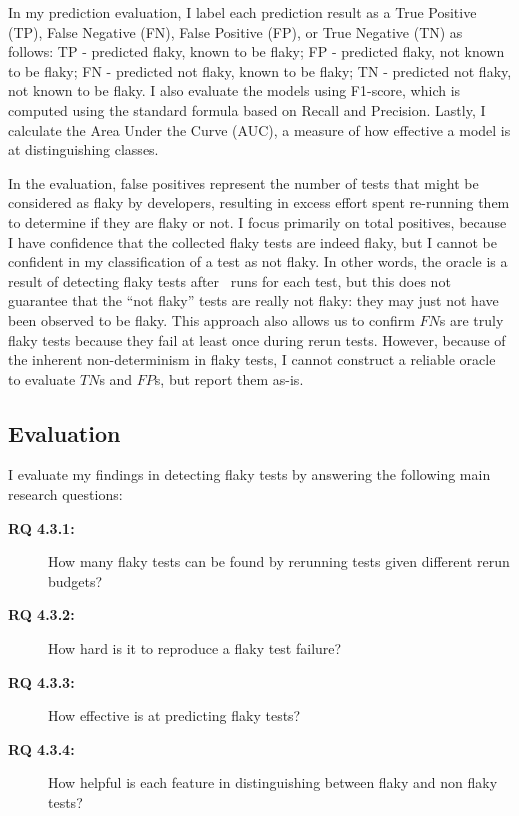 In my prediction evaluation, I label each prediction result as a True Positive (TP), False Negative (FN), False Positive (FP), or True Negative (TN) as follows:
TP - predicted flaky, known to be flaky; FP - predicted flaky, not known to be flaky; FN - predicted not flaky, known to be flaky; TN - predicted not flaky, not known to be flaky.
I also evaluate the models using F1-score, which is computed using the standard formula based on Recall and Precision. %
Lastly, I calculate the Area Under the Curve (AUC), a measure of how effective a model is at distinguishing classes.

In the evaluation, false positives represent the number of tests that might be considered as flaky by developers, resulting in excess effort spent re-running them to determine if they are flaky or not. I focus primarily on total positives, because I have confidence that the collected flaky tests are indeed flaky, but I cannot be confident in my classification of a test as not flaky. 
In other words, the oracle is a result of detecting flaky tests after \numruns~runs for each test, but this does not guarantee that the ``not flaky'' tests are really not flaky: they may just not have been observed to be flaky. 
This approach also allows us to confirm $FN$s are truly flaky tests because they fail at least once during rerun tests.
However, because of the inherent non-determinism in flaky tests, I cannot construct a reliable oracle to evaluate $TN$s and $FP$s, but report them as-is.







\subsection{Evaluation}
I evaluate my findings in detecting flaky tests by answering the following  main research questions:


\begin{description}
  \item[\textbf{RQ 4.3.1:}] How many flaky tests can be found by rerunning tests given different rerun budgets?
  \item[\textbf{RQ 4.3.2:}] How hard is it to reproduce a flaky test failure?

  \item[\textbf{RQ 4.3.3:}] How effective is \sysName at predicting flaky tests?
  \item[\textbf{RQ 4.3.4:}] How helpful is each feature in distinguishing between flaky and non flaky tests?
  
 \end{description}



